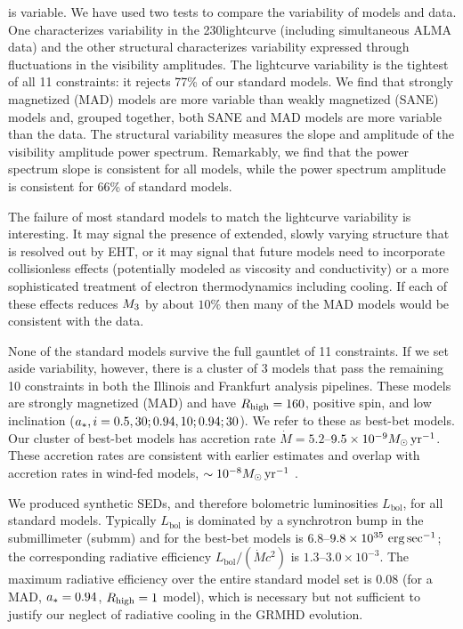 \sgra is variable.  We have used two tests to compare the variability of models and data. One characterizes variability in the 230\GHz lightcurve (including simultaneous ALMA data) and the other structural characterizes variability expressed through fluctuations in the visibility amplitudes.  The lightcurve variability is the tightest of all 11 constraints: it rejects 77\% of our standard models.  We find that strongly magnetized (MAD) models are more variable than weakly magnetized (SANE) models and, grouped together, both SANE and MAD models are more variable than the data.  The structural variability measures the slope and amplitude of the visibility amplitude power spectrum.  Remarkably, we find that the power spectrum slope is consistent for all models, while the power spectrum amplitude is consistent for 66\% of standard models.

The failure of most standard models to match the lightcurve variability is interesting.  It may signal the presence of extended, slowly varying structure that is resolved out by EHT, or it may signal that future models need to incorporate collisionless effects (potentially modeled as viscosity and conductivity) or a more sophisticated treatment of electron thermodynamics including cooling.  If each of these effects reduces $M_{3}$ by about $10\%$ then many of the MAD models would be consistent with the data.

None of the standard models survive the full gauntlet of 11 constraints.  If we set aside variability, however, there is a cluster of 3 models that pass the remaining 10 constraints in both the Illinois and Frankfurt analysis pipelines. These models are strongly magnetized (MAD) and have $R_\mathrm{high} = 160$, positive spin, and low inclination ($a_*, i = 0.5, 30; 0.94, 10; 0.94; 30$).  We refer to these as best-bet models.
Our cluster of best-bet models has accretion rate $\dot{M} = 5.2$--$9.5 \times 10^{-9}M_\odot\,\mathrm{yr}^{-1}$.  These accretion rates are consistent with earlier estimates and overlap with accretion rates in wind-fed models, $\sim 10^{-8} M_\odot\,\mathrm{yr}^{-1}$ \citep{2020ApJ...896L...6R}.

We produced synthetic SEDs, and therefore bolometric luminosities $L_\mathrm{bol}$, for all standard models.  Typically $L_\mathrm{bol}$ is dominated by a synchrotron bump in the submillimeter (submm) and for the best-bet models is $6.8$--$9.8\times10^{35}\,\,\mathrm{erg}\,\mathrm{sec}^{-1}$; the corresponding radiative efficiency $L_\mathrm{bol}/(\dot{M} c^2)$ is $1.3$--$3.0\times 10^{-3}$.  The maximum radiative efficiency over the entire standard model set is 0.08 (for a MAD, $a_* = 0.94$, $R_\mathrm{high} = 1$ model), which is necessary but not sufficient to justify our neglect of radiative cooling in the GRMHD evolution.

